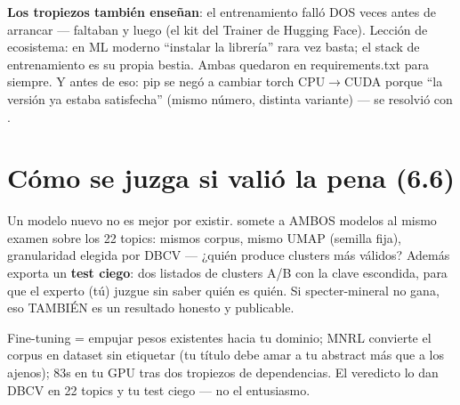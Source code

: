 \documentclass[11pt,a4paper]{article}
\begin{document}
\begin{ojo}
\textbf{Los tropiezos también enseñan}: el entrenamiento falló DOS veces antes de arrancar —
faltaban  y luego  (el kit del Trainer de Hugging Face).
Lección de ecosistema: en ML moderno ``instalar la librería'' rara vez basta; el stack de
entrenamiento es su propia bestia. Ambas quedaron en requirements.txt para siempre.
Y antes de eso: pip se negó a cambiar torch CPU$\rightarrow$CUDA porque ``la versión ya
estaba satisfecha'' (mismo número, distinta variante) — se resolvió con
.
\end{ojo}

\section{Cómo se juzga si valió la pena (6.6)}

Un modelo nuevo no es mejor por existir.  somete a AMBOS modelos
al mismo examen sobre los 22 topics: mismos corpus, mismo UMAP (semilla fija), granularidad
elegida por DBCV — ¿quién produce clusters más válidos? Además exporta un \textbf{test
ciego}: dos listados de clusters A/B con la clave escondida, para que el experto (tú)
juzgue sin saber quién es quién. Si specter-mineral no gana, eso TAMBIÉN es un resultado
honesto y publicable.

\begin{resumen}
Fine-tuning = empujar pesos existentes hacia tu dominio; MNRL convierte el corpus en
dataset sin etiquetar (tu título debe amar a tu abstract más que a los ajenos); 83s en tu
GPU tras dos tropiezos de dependencias. El veredicto lo dan DBCV en 22 topics y tu test
ciego — no el entusiasmo.
\end{resumen}
\end{document}
